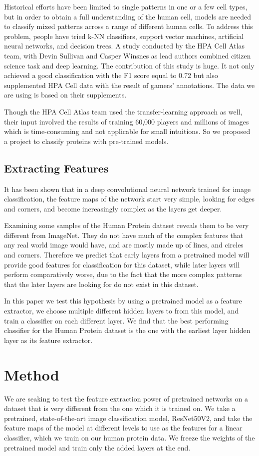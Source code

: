 \documentclass{article}
\begin{document}
Historical efforts have been limited to single patterns in one or a few cell types, but in order to obtain a full understanding of the human cell, models are needed to classify mixed patterns across a range of different human cells. To address this problem, people have tried k-NN classifiers, support vector machines, artificial neural networks, and decision trees. A study conducted by the HPA Cell Atlas team, with Devin Sullivan and Casper Winsnes as lead authors combined citizen science task and deep learning. The contribution of this study is huge. It not only achieved a good classification with the F1 score equal to 0.72 but also supplemented HPA Cell data with the result of gamers’ annotations. The data we are using is based on their supplements.

Though the HPA Cell Atlas team used the transfer-learning approach as well, their input involved the results of training 60,000 players and millions of images which is time-consuming and not applicable for small intuitions. So we proposed a project to classify proteins with pre-trained models.

  
\subsection{Extracting Features}
It has been shown that in a deep convolutional neural network trained for image classification, the
feature maps of the network start very simple, looking for edges and corners, and become increasingly
complex as the layers get deeper. 

Examining some samples of the Human Protein dataset reveals them to be very different from ImageNet. They 
do not have much of the complex features that any real world image would have, and are mostly made up of 
lines, and circles and corners. Therefore we predict that early layers from a pretrained model will
provide good features for classification for this dataset, while later layers will perform comparatively worse, 
due to the fact that the more complex patterns that the later layers are looking for do not exist in this 
dataset. 

In this paper we test this hypothesis by using a pretrained model as a feature extractor, we choose multiple different
hidden layers to from this model, and train a classifier on each different layer. We find that the best performing classifier
for the Human Protein dataset is the one with the earliest layer hidden layer as its feature extractor.
\section{Method}
We are seaking to test the feature extraction power of pretrained networks on 
a dataset that is very different from the one which it is trained on. We take 
a pretrained, state-of-the-art image classification model, ResNet50V2, and take
the feature maps of the model at different levels to use as the features for 
a linear classifier, which we train on our human protein data. We freeze the weights
of the pretrained model and train only the added layers at the end.
\end{document}
